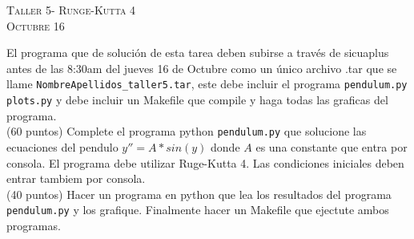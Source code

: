 \documentclass[11pt]{article}
\begin{document}
\begin{center}
\textsc{\LARGE Taller 5- Runge-Kutta 4}\\
\textsc{\large Octubre 16 }
\end{center}


El programa que de soluci\'on de esta tarea deben subirse a
trav\'es de sicuaplus antes de las 8:30am del jueves 16 de Octubre como
un \'unico archivo .tar que se llame
\verb"NombreApellidos_taller5.tar", este debe incluir el programa \verb+pendulum.py+ \verb+plots.py+ y debe incluir un Makefile que compile y haga todas las graficas del programa.\\


(60 puntos) Complete el programa python \verb+pendulum.py+ que solucione las ecuaciones del pendulo $y'' = A*sin(y)$ donde $A$ es una constante que entra por consola. El programa debe utilizar Ruge-Kutta 4. Las condiciones iniciales deben entrar tambiem por consola.\\
 
(40 puntos) Hacer un programa en python que lea los resultados del programa \verb+pendulum.py+ y los grafique. Finalmente hacer un Makefile que ejectute ambos programas.  
\end{document}

